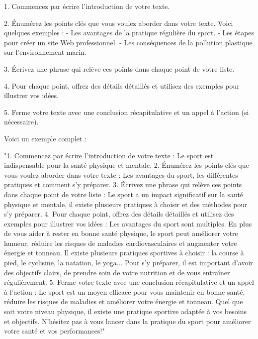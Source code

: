 \documentclass{article}
\begin{document}
1. Commencez par écrire l'introduction de votre texte.

2. Énumérez les points clés que vous voulez aborder dans votre texte. Voici quelques exemples :
   - Les avantages de la pratique régulière du sport.
   - Les étapes pour créer un site Web professionnel.
   - Les conséquences de la pollution plastique sur l'environnement marin.

3. Écrivez une phrase qui relève ces points dans chaque point de votre liste.

4. Pour chaque point, offrez des détails détaillés et utilisez des exemples pour illustrer vos idées.

5. Ferme votre texte avec une conclusion récapitulative et un appel à l'action (si nécessaire).

Voici un exemple complet :

"1. Commencez par écrire l'introduction de votre texte : Le sport est indispensable pour la santé physique et mentale.
2. Énumérez les points clés que vous voulez aborder dans votre texte : Les avantages du sport, les différentes pratiques et comment s'y préparer.
3. Écrivez une phrase qui relève ces points dans chaque point de votre liste : Le sport a un impact significatif sur la santé physique et mentale, il existe plusieurs pratiques à choisir et des méthodes pour s'y préparer.
4. Pour chaque point, offrez des détails détaillés et utilisez des exemples pour illustrer vos idées : Les avantages du sport sont multiples. En plus de vous aider à rester en bonne santé physique, le sport peut améliorer votre humeur, réduire les risques de maladies cardiovasculaires et augmenter votre énergie et tonneau. Il existe plusieurs pratiques sportives à choisir : la course à pied, le cyclisme, la natation, le yoga... Pour s'y préparer, il est important d'avoir des objectifs clairs, de prendre soin de votre nutrition et de vous entraîner régulièrement.
5. Ferme votre texte avec une conclusion récapitulative et un appel à l'action : Le sport est un moyen efficace pour vous maintenir en bonne santé, réduire les risques de maladies et améliorer votre énergie et tonneau. Quel que soit votre niveau physique, il existe une pratique sportive adaptée à vos besoins et objectifs. N'hésitez pas à vous lancer dans la pratique du sport pour améliorer votre santé et vos performances!"
\end{document}
